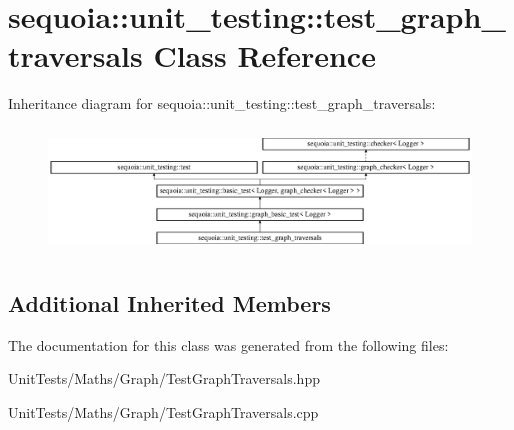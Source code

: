 \hypertarget{classsequoia_1_1unit__testing_1_1test__graph__traversals}{}\section{sequoia\+::unit\+\_\+testing\+::test\+\_\+graph\+\_\+traversals Class Reference}
\label{classsequoia_1_1unit__testing_1_1test__graph__traversals}
Inheritance diagram for sequoia\+::unit\+\_\+testing\+::test\+\_\+graph\+\_\+traversals\+:\begin{figure}[H]
\begin{center}
\leavevmode
\includegraphics[height=3.357314cm]{classsequoia_1_1unit__testing_1_1test__graph__traversals}
\end{center}
\end{figure}
\subsection*{Additional Inherited Members}


The documentation for this class was generated from the following files\+:\begin{DoxyCompactItemize}
\item 
Unit\+Tests/\+Maths/\+Graph/Test\+Graph\+Traversals.\+hpp\item 
Unit\+Tests/\+Maths/\+Graph/Test\+Graph\+Traversals.\+cpp\end{DoxyCompactItemize}
